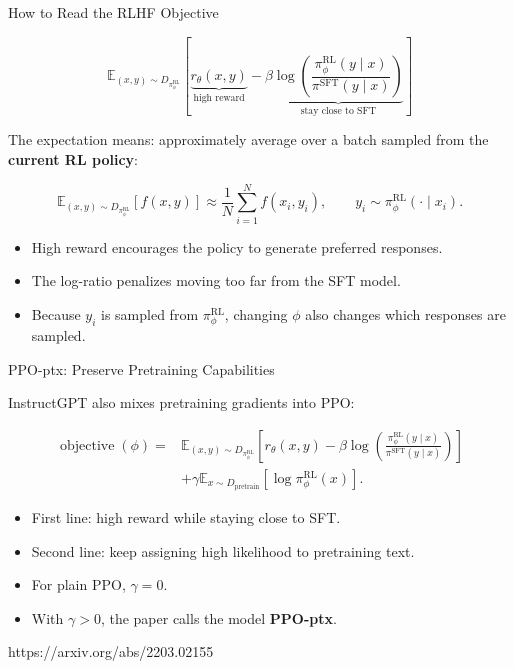 \documentclass[11pt,compress,t,notes=noshow, xcolor=table]{beamer}
\begin{document}

\begin{vbframe}{How to Read the RLHF Objective}

\[
\mathbb{E}_{(x,y)\sim D_{\pi_\phi^{\mathrm{RL}}}}
\left[
\underbrace{r_\theta(x,y)}_{\text{high reward}}
-
\beta
\underbrace{
\log
\left(
\frac{
\pi_\phi^{\mathrm{RL}}(y\mid x)
}{
\pi^{\mathrm{SFT}}(y\mid x)
}
\right)
}_{\text{stay close to SFT}}
\right]
\]

The expectation means: approximately average over a batch sampled
from the \textbf{current RL policy}:

\[
\mathbb{E}_{(x,y)\sim D_{\pi_\phi^{\mathrm{RL}}}}[f(x,y)]
\approx
\frac{1}{N}\sum_{i=1}^{N}f(x_i,y_i),
\qquad
y_i\sim\pi_\phi^{\mathrm{RL}}(\cdot\mid x_i).
\]

\begin{itemize}
    \item High reward encourages the policy to generate preferred responses.
    \item The log-ratio penalizes moving too far from the SFT model.
    \item Because $y_i$ is sampled from $\pi_\phi^{\mathrm{RL}}$,
          changing $\phi$ also changes which responses are sampled.
\end{itemize}

\end{vbframe}



\begin{vbframe}{PPO-ptx: Preserve Pretraining Capabilities}

InstructGPT also mixes pretraining gradients into PPO:

\[
\begin{split}
\operatorname{objective}(\phi)
={}&
\mathbb{E}_{(x,y)\sim D_{\pi_\phi^{\mathrm{RL}}}}
\left[
r_\theta(x,y)
-
\beta
\log
\left(
\frac{
\pi_\phi^{\mathrm{RL}}(y\mid x)
}{
\pi^{\mathrm{SFT}}(y\mid x)
}
\right)
\right]
\\
&+
\gamma
\mathbb{E}_{x\sim D_{\mathrm{pretrain}}}
\left[
\log
\pi_\phi^{\mathrm{RL}}(x)
\right].
\end{split}
\]

\begin{itemize}
    \item First line: high reward while staying close to SFT.
    \item Second line: keep assigning high likelihood to pretraining text.
    \item For plain PPO, $\gamma=0$.
    \item With $\gamma>0$, the paper calls the model \textbf{PPO-ptx}.
\end{itemize}

{https://arxiv.org/abs/2203.02155}

\end{vbframe}
\end{document}
